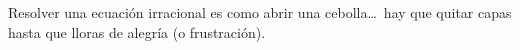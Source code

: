 \begin{capitulobox}
Resolver una ecuación irracional es como abrir una cebolla\ldots\ hay que quitar 
capas hasta que lloras de alegría (o frustración).
\end{capitulobox}
